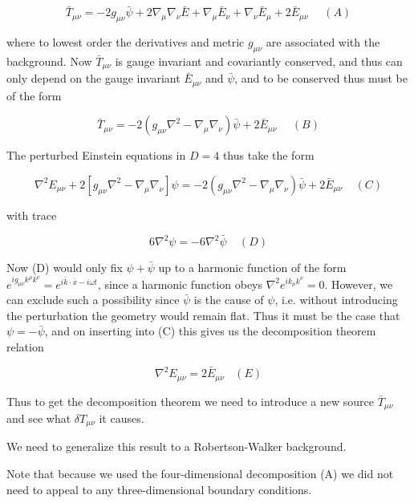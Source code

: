 \documentclass[10pt,letterpaper]{article}
\numberwithin{equation}{section}
\begin{document}
%

$$
\bar{T}_{\mu\nu}=-2g_{\mu\nu}\bar{\psi}+2\nabla_{\mu}\nabla_{\nu}\bar{E}
+ \nabla_{\mu}\bar{E}_{\nu}+\nabla_{\nu}\bar{E}_{\mu}+2\bar{E}_{\mu\nu}~~~~~~(A)$$

%

where to lowest order the derivatives and metric $g_{\mu\nu}$ are associated with the background. Now $\bar{T}_{\mu\nu}$ is gauge invariant and covariantly conserved, and thus can only depend on the gauge invariant $\bar{E}_{\mu\nu}$ and $\bar{\psi}$, and to be conserved thus must be of the form

%

$$\bar{T}_{\mu\nu}=-2(g_{\mu\nu}\nabla^2-\nabla_{\mu}\nabla_{\nu})\bar{\psi}+2\bar{E}_{\mu\nu}~~~~~~(B)$$

%

The perturbed Einstein equations in $D=4$ thus take the form

%

$$\nabla^2E_{\mu\nu}+2[g_{\mu\nu}\nabla^2-\nabla_{\mu}\nabla_{\nu}]\psi=-2(g_{\mu\nu}\nabla^2-\nabla_{\mu}\nabla_{\nu})\bar{\psi}+2\bar{E}_{\mu\nu}~~~~~(C)$$

%

with trace

%

$$6\nabla^2\psi=-6\nabla^2\bar{\psi}~~~~~(D)$$

%

Now (D) would only fix $\psi+\bar{\psi}$ up to a harmonic function of the form $e^{ig_{\mu\nu}k^{\mu}k^{\nu}}=e^{i\bar{k}\cdot \bar{x}-i\omega t}$, since a harmonic function obeys $\nabla^2e^{ik_{\mu}k^{\nu}}=0$.  However, we can exclude such a possibility since $\bar{\psi}$ is the cause of $\psi$, i.e. without introducing the perturbation the geometry would remain flat. Thus it must be the case that $\psi=-\bar{\psi}$, and on inserting into (C) this gives us the decomposition theorem relation 

%

$$\nabla^2E_{\mu\nu}=2\bar{E}_{\mu\nu}~~~~(E)$$

%

Thus to get the decomposition theorem we need to introduce a new source $\bar{T}_{\mu\nu}$ and see what $\delta T_{\mu\nu}$ it causes.


We need to generalize this result to a Robertson-Walker background.


Note that because we used the four-dimensional decomposition (A) we did not need to appeal to any three-dimensional boundary conditions.
\end{document}
